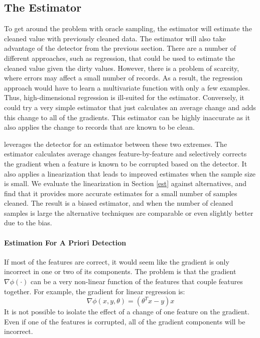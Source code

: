 
\subsection{The Estimator}\label{sampling}
To get around the problem with oracle sampling, the estimator will estimate the cleaned value with previously cleaned data.
The estimator will also take advantage of the detector from the previous section.
There are a number of different approaches, such as regression, that could be used to estimate the cleaned value given the dirty values.
However, there is a problem of scarcity, where errors may affect a small number of records.
As a result, the regression approach would have to learn a multivariate function with only a few examples.
Thus, high-dimensional regression is ill-suited for the estimator.
Conversely, it could try a very simple estimator that just calculates an average change and adds this change to all of the gradients.
This estimator can be highly inaccurate as it also applies the change to records that are known to be clean.

\sys leverages the detector for an estimator between these two extremes.
The estimator calculates average changes feature-by-feature and selectively corrects the gradient when a feature is known to be corrupted based on the detector.
It also applies a linearization that leads to improved estimates when the sample size is small.
We evaluate the linearization in Section \ref{est} against alternatives, and find that it provides more accurate estimates for a small number of samples cleaned.
The result is a biased estimator, and when the number of cleaned samples is large the alternative techniques are comparable or even slightly better due to the bias.

\paragraph{Estimation For A Priori Detection}
If most of the features are correct, it would seem like the gradient is only
incorrect in one or two of its components.
The problem is that the gradient $\nabla\phi(\cdot)$ can be a very non-linear function of the features that couple features together.
For example, the gradient for linear regression is:
\[
\nabla\phi(x,y,\theta) = (\theta^Tx - y)x
\]
It is not possible to isolate the effect of a change of one feature on the gradient.
Even if one of the features is corrupted, all of the gradient components will be incorrect.

